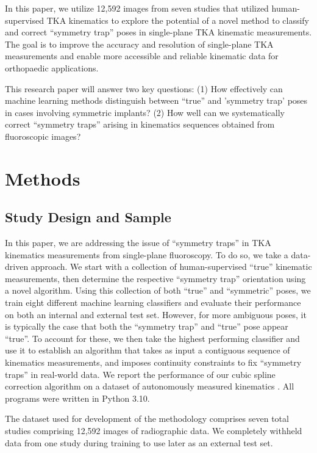 In this paper, we utilize 12,592 images from seven studies that utilized human-supervised TKA kinematics \cite{jennyREGISTRATIONKNEEKINEMATICS2015,kefalaAssessmentKneeKinematics2017,okamotoVivoKneeKinematics2011,palm-vlasakMinimalVariationTop2022,scottCanTotalKnee2016,watanabeKneeKinematicsAnterior2013,watanabeInvivoKinematicsHighflex2016} to explore the potential of a novel method to classify and correct ``symmetry trap'' poses in single-plane TKA kinematic measurements.
The goal is to improve the accuracy and resolution of single-plane TKA measurements and enable more accessible and reliable kinematic data for orthopaedic applications.

This research paper will answer two key questions:  (1) How effectively can machine learning methods distinguish between ``true'' and 'symmetry trap' poses in cases involving symmetric implants? (2) How well can we systematically correct ``symmetry traps'' arising in kinematics sequences obtained from fluoroscopic images?

\section{Methods}
\subsection{Study Design and Sample}
In this paper, we are addressing the issue of “symmetry traps” in TKA kinematics measurements from single-plane fluoroscopy.
To do so, we take a data-driven approach.
We start with a collection of human-supervised “true” kinematic measurements, then determine the respective “symmetry trap” orientation using a novel algorithm.
Using this collection of both “true” and “symmetric” poses, we train eight different machine learning classifiers and evaluate their performance on both an internal and external test set.
However, for more ambiguous poses, it is typically the case that both the “symmetry trap” and “true” pose appear “true”.
To account for these, we then take the highest performing classifier and use it to establish an algorithm that takes as input a contiguous sequence of kinematics measurements, and imposes continuity constraints to fix “symmetry traps” in real-world data.
We report the performance of our cubic spline correction algorithm on a dataset of autonomously measured kinematics \cite{jensenJointTrackMachine2023}.
All programs were written in Python 3.10.

The dataset used for development of the methodology comprises seven total studies \cite{jennyREGISTRATIONKNEEKINEMATICS2015,kefalaAssessmentKneeKinematics2017,okamotoVivoKneeKinematics2011,palm-vlasakMinimalVariationTop2022,scottCanTotalKnee2016,watanabeKneeKinematicsAnterior2013,watanabeInvivoKinematicsHighflex2016} comprising 12,592 images of radiographic data.
We completely withheld data from one study \cite{okamotoVivoKneeKinematics2011} during training to use later as an external test set.

